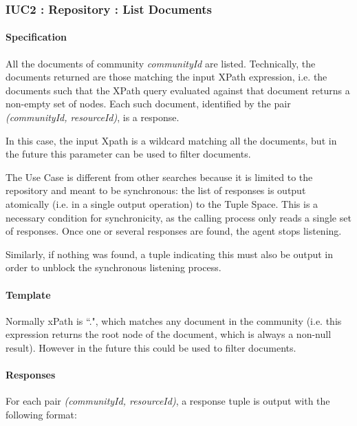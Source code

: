 \documentclass[titlepage]{article}%
\begin{document}
\subsubsection{IUC2 : Repository : List Documents}
\label{iuc2}
\paragraph{Specification} 
All the documents of community \emph{communityId} are listed. Technically, the documents returned are those matching the input XPath expression, i.e. the documents such that the XPath query evaluated against that document returns a non-empty set of nodes. 
Each such document, identified by the pair \emph{(communityId, resourceId)}, is a response.

In this case, the input Xpath is a wildcard matching all the documents, but in the future this parameter can be used to filter documents. 

The Use Case is different from other searches because it is limited to the repository and meant to be synchronous: the list of responses is output atomically (i.e. in a single output operation) to the Tuple Space. This is a necessary condition for synchronicity, as the calling process only reads a single set of responses. Once one or several responses are found, the agent stops listening.

Similarly, if nothing was found, a tuple indicating this must also be output in order to unblock the synchronous listening process.

\paragraph{Template}
\begin{equation*}
[ \text{``SynchroLocalSearch"}; communityId; xPath] 
\end{equation*}
Normally xPath is ``.", which matches any document in the community (i.e. this expression returns the root node of the document, which is always a non-null result). However in the future this could be used to filter documents.

\paragraph{Responses}

For each pair \emph{(communityId, resourceId)}, a response tuple is output with the following format:
\begin{equation*}
[ \text{``SynchroLocalSearchResp"}; communityId; xpath; resourceId]
\end{equation*}
\end{document}
